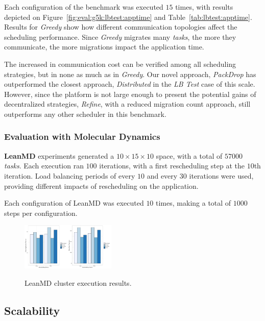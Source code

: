 Each configuration of the benchmark was executed $15$ times, with results depicted on Figure~\ref{fig:eval:g5k:lbtest:apptime} and Table~\ref{tab:lbtest:apptime}.
Results for \textit{Greedy} show how different communication topologies affect the scheduling performance.
Since \textit{Greedy} migrates many \textit{tasks}, the more they communicate, the more migrations impact the application time.

The increased in communication cost can be verified among all scheduling strategies, but in none as much as in \textit{Greedy}.
Our novel approach, \textit{PackDrop} has outperformed the closest approach, \textit{Distributed} in the \textit{LB Test} case of this scale.
However, since the platform is not large enough to present the potential gains of decentralized strategies, \textit{Refine}, with a reduced migration count approach, still outperforms any other scheduler in this benchmark.

\subsubsection*{Evaluation with Molecular Dynamics}

\textbf{LeanMD} experiments generated a $10\times15\times10$ space, with a total of $57000$ \textit{tasks}.
Each execution ran $100$ iterations, with a first rescheduling step at the $10$th iteration. 
Load balancing periods of every $10$ and every $30$ iterations were used, providing different impacts of rescheduling on the application.

Each configuration of LeanMD was executed $10$ times, making a total of $1000$ steps per configuration. 


\begin{figure}
	\centering
    \includegraphics[width=0.2\textwidth]{images/apptime_leanmd_g5k.pdf}\includegraphics[width=0.2\textwidth]{images/steptime_leanmd_g5k.pdf}
    \caption{LeanMD cluster execution results.}
    \label{fig:eval:g5k:leanmd:time}
\end{figure}

\subsection{Scalability}